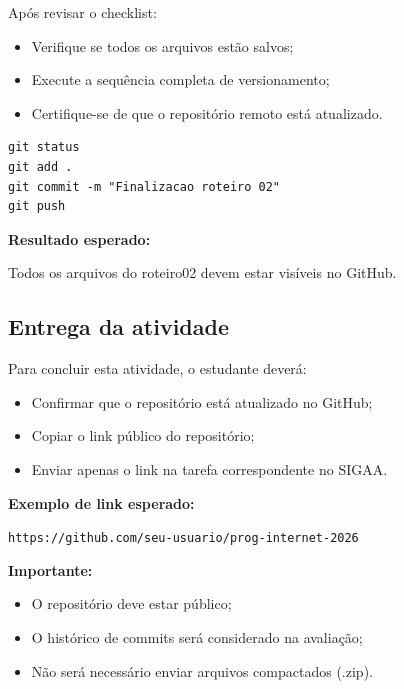 \documentclass[12pt,a4paper]{article}
\begin{document}

\begin{boxAtividade}

Após revisar o checklist:

\begin{itemize}
\item Verifique se todos os arquivos estão salvos;
\item Execute a sequência completa de versionamento;
\item Certifique-se de que o repositório remoto está atualizado.
\end{itemize}

\begin{boxCodigo}
\begin{verbatim}
git status
git add .
git commit -m "Finalizacao roteiro 02"
git push
\end{verbatim}
\end{boxCodigo}

\textbf{Resultado esperado:}

Todos os arquivos do roteiro02 devem estar visíveis no GitHub.

\end{boxAtividade}




\subsection{Entrega da atividade}
\begin{boxAtividade}

Para concluir esta atividade, o estudante deverá:

\begin{itemize}
\item Confirmar que o repositório está atualizado no GitHub;
\item Copiar o link público do repositório;
\item Enviar apenas o link na tarefa correspondente no SIGAA.
\end{itemize}

\textbf{Exemplo de link esperado:}

\texttt{https://github.com/seu-usuario/prog-internet-2026}

\textbf{Importante:}
\begin{itemize}
\item O repositório deve estar público;
\item O histórico de commits será considerado na avaliação;
\item Não será necessário enviar arquivos compactados (.zip).
\end{itemize}

\end{boxAtividade}
\end{document}

